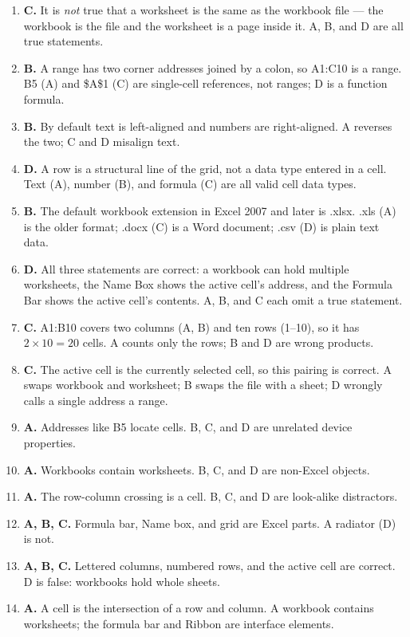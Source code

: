 \begin{enumerate}[label=\textbf{Q\arabic*.}, leftmargin=*]
  hold many worksheets.
\item \textbf{C.} It is \emph{not} true that a worksheet is the same as the
  workbook file --- the workbook is the file and the worksheet is a page
  inside it. A, B, and D are all true statements.
\item \textbf{B.} A range has two corner addresses joined by a colon, so
  A1:C10 is a range. B5 (A) and \$A\$1 (C) are single-cell references, not
  ranges; D is a function formula.
\item \textbf{B.} By default text is left-aligned and numbers are
  right-aligned. A reverses the two; C and D misalign text.
\item \textbf{D.} A row is a structural line of the grid, not a data type
  entered in a cell. Text (A), number (B), and formula (C) are all valid
  cell data types.
\item \textbf{B.} The default workbook extension in Excel 2007 and later is
  .xlsx. .xls (A) is the older format; .docx (C) is a Word document; .csv (D)
  is plain text data.
\item \textbf{D.} All three statements are correct: a workbook can hold
  multiple worksheets, the Name Box shows the active cell's address, and the
  Formula Bar shows the active cell's contents. A, B, and C each omit a true
  statement.
\item \textbf{C.} A1:B10 covers two columns (A, B) and ten rows (1--10), so it
  has $2 \times 10 = 20$ cells. A counts only the rows; B and D are wrong
  products.
\item \textbf{C.} The active cell is the currently selected cell, so this
  pairing is correct. A swaps workbook and worksheet; B swaps the file with a
  sheet; D wrongly calls a single address a range.

\item \textbf{A.} Addresses like B5 locate cells. B, C, and D are unrelated device properties.
\item \textbf{A.} Workbooks contain worksheets. B, C, and D are non-Excel objects.
\item \textbf{A.} The row-column crossing is a cell. B, C, and D are look-alike distractors.
\item \textbf{A, B, C.} Formula bar, Name box, and grid are Excel parts. A radiator (D) is not.
\item \textbf{A, B, C.} Lettered columns, numbered rows, and the active cell are correct. D is false: workbooks hold whole sheets.
\item \textbf{A.} A cell is the intersection of a row and column. A workbook contains worksheets; the formula bar and Ribbon are interface elements.


\end{enumerate}
